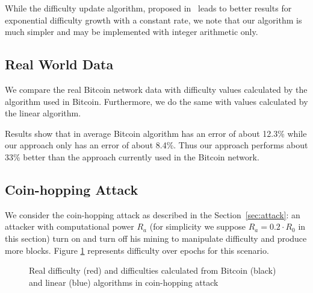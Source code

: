 \documentclass[]{llncs}
\newcommand{\attackname}{coin-hopping attack}
\newcommand{\AttackName}{Coin-hopping Attack}
\begin{document}
While the difficulty update algorithm, proposed in~\cite{kraft2015difficulty} leads to better results for exponential difficulty growth with a constant rate, we note that our algorithm is much simpler and may be implemented with integer arithmetic only.

\subsection{Real World Data}

We compare the real Bitcoin network data with difficulty values calculated by the algorithm used in Bitcoin. Furthermore, we do the same with values calculated by the linear algorithm. %


Results show that in average Bitcoin algorithm has an error of about 12.3\% while our approach only has an error of about 8.4\%. Thus  our approach performs about 33\% better than the approach currently used in the Bitcoin network.

\subsection{\AttackName}

We consider the \attackname{} as described in the Section~\ref{sec:attack}: an attacker with computational power \(R_a\) (for simplicity we suppose \(R_a=0.2 \cdot R_0 \) in this section) turn on and turn off his mining to manipulate difficulty and produce more blocks.
Figure \ref{fig:attack} represents difficulty over epochs for this scenario.

\begin{figure}[h]
\caption{Real difficulty (red) and difficulties calculated from Bitcoin (black) and linear (blue) algorithms in \attackname{}}
\label{fig:attack}
\end{figure}
\end{document}
